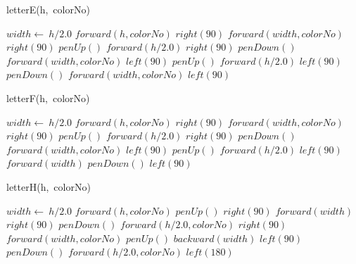 \documentclass[a4paper,10pt]{article}
\begin{document}
\begin{algorithm}
\caption{letterE(h,\ colorNo)}
\begin{algorithmic}[5]

\STATE {}
\STATE {}
  \STATE \(width\gets\ h/2.0\)
  \STATE \(forward(h,colorNo)\)
  \STATE \(right(90)\)
  \STATE \(forward(width,colorNo)\)
  \STATE \(right(90)\)
  \STATE \(penUp()\)
  \STATE \(forward(h/2.0)\)
  \STATE \(right(90)\)
  \STATE \(penDown()\)
  \STATE \(forward(width,colorNo)\)
  \STATE \(left(90)\)
  \STATE \(penUp()\)
  \STATE \(forward(h/2.0)\)
  \STATE \(left(90)\)
  \STATE \(penDown()\)
  \STATE \(forward(width,colorNo)\)
  \STATE \(left(90)\)

\end{algorithmic}
\end{algorithm}


\begin{algorithm}
\caption{letterF(h,\ colorNo)}
\begin{algorithmic}[5]

\STATE {}
\STATE {}
  \STATE \(width\gets\ h/2.0\)
  \STATE \(forward(h,colorNo)\)
  \STATE \(right(90)\)
  \STATE \(forward(width,colorNo)\)
  \STATE \(right(90)\)
  \STATE \(penUp()\)
  \STATE \(forward(h/2.0)\)
  \STATE \(right(90)\)
  \STATE \(penDown()\)
  \STATE \(forward(width,colorNo)\)
  \STATE \(left(90)\)
  \STATE \(penUp()\)
  \STATE \(forward(h/2.0)\)
  \STATE \(left(90)\)
  \STATE \(forward(width)\)
  \STATE \(penDown()\)
  \STATE \(left(90)\)

\end{algorithmic}
\end{algorithm}


\begin{algorithm}
\caption{letterH(h,\ colorNo)}
\begin{algorithmic}[5]

\STATE {}
\STATE {}
  \STATE \(width\gets\ h/2.0\)
  \STATE \(forward(h,colorNo)\)
  \STATE \(penUp()\)
  \STATE \(right(90)\)
  \STATE \(forward(width)\)
  \STATE \(right(90)\)
  \STATE \(penDown()\)
  \STATE \(forward(h/2.0,colorNo)\)
  \STATE \(right(90)\)
  \STATE \(forward(width,colorNo)\)
  \STATE \(penUp()\)
  \STATE \(backward(width)\)
  \STATE \(left(90)\)
  \STATE \(penDown()\)
  \STATE \(forward(h/2.0,colorNo)\)
  \STATE \(left(180)\)

\end{algorithmic}
\end{algorithm}
\end{document}
